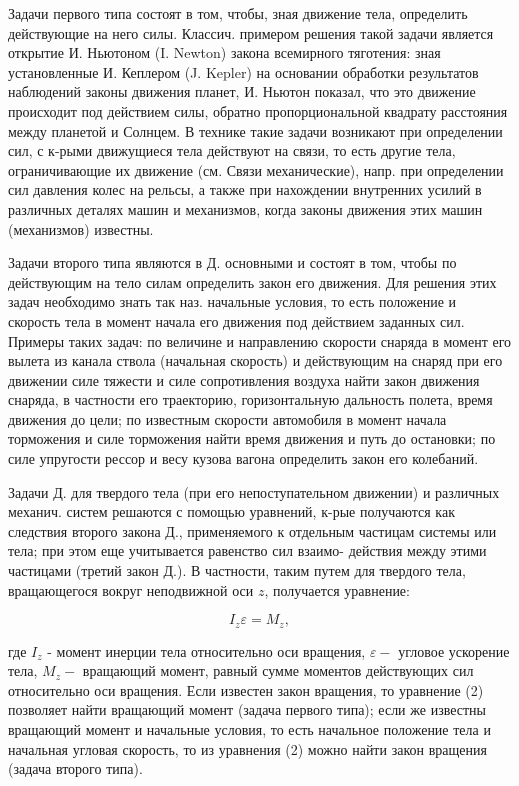 \documentclass[10pt]{article}
\begin{document}
Задачи первого типа состоят в том, чтобы, зная движение тела, определить действующие на него силы. Классич. примером решения такой задачи является открытие И. Ньютоном (I. Newton) закона всемирного тяготения: зная установленные И. Кеплером (J. Kepler) на основании обработки результатов наблюдений законы движения планет, И. Ньютон показал, что это движение происходит под действием силы, обратно пропорциональной квадрату расстояния между планетой и Солнцем. В технике такие задачи возникают при определении сил, с к-рыми движущиеся тела действуют на связи, то есть другие тела, ограничивающие их движение (см. Связи механические), напр. при определении сил давления колес на рельсы, а также при нахождении внутренних усилий в различных деталях машин и механизмов, когда законы движения этих машин (механизмов) известны.



Задачи второго типа являются в Д. основными и состоят в том, чтобы по действующим на тело силам определить закон его движения. Для решения этих задач необходимо знать так наз. начальные условия, то есть положение и скорость тела в момент начала его движения под действием заданных сил. Примеры таких задач: по величине и направлению скорости снаряда в момент его вылета из канала ствола (начальная скорость) и действующим на снаряд при его движении силе тяжести и силе сопротивления воздуха найти закон движения снаряда, в частности его траекторию, горизонтальную дальность полета, время движения до цели; по известным скорости автомобиля в момент начала торможения и силе торможения найти время движения и путь до остановки; по силе упругости рессор и весу кузова вагона определить закон его колебаний.



Задачи Д. для твердого тела (при его непоступательном движении) и различных механич. систем решаются с помощью уравнений, к-рые получаются как следствия второго закона Д., применяемого к отдельным частицам системы или тела; при этом еще учитывается равенство сил взаимо- действия между этими частицами (третий закон Д.). В частности, таким путем для твердого тела, вращающегося вокруг неподвижной оси $z$, получается уравнение:



\[

I_{z} \varepsilon=M_{z},

\]



где $I_{z}$ - момент инерции тела относительно оси вращения, $\varepsilon-$ угловое ускорение тела, $M_{z}-$ вращающий момент, равный сумме моментов действующих сил относительно оси вращения. Если известен закон вращения, то уравнение (2) позволяет найти вращающий момент (задача первого типа); если же известны вращающий момент и начальные условия, то есть начальное положение тела и начальная угловая скорость, то из уравнения (2) можно найти закон вращения (задача второго типа).
\end{document}

